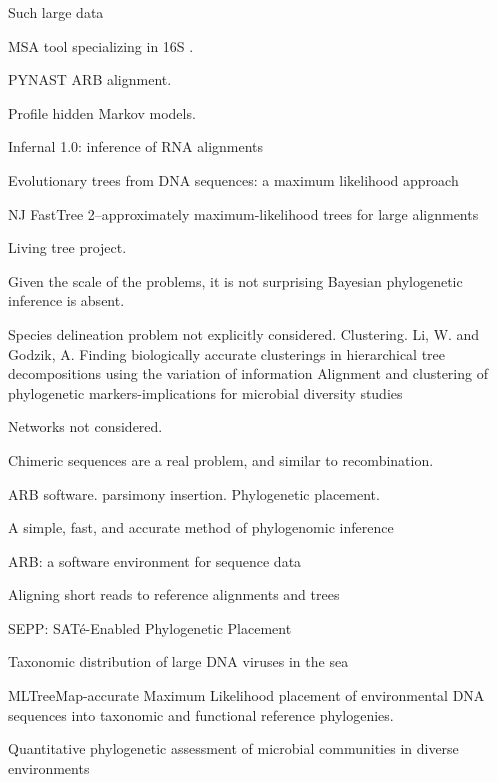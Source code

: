 \documentclass{amsart}
\begin{document}
Such large data

MSA tool specializing in 16S \cite{pruesse2012sina}.

PYNAST
ARB alignment.

\citep{eddy1998profile}
Profile hidden Markov models.

\citep{nawrocki2009infernal}
Infernal 1.0: inference of RNA alignments

\citep{felsenstein1981evolutionary}
{Evolutionary trees from DNA sequences: a maximum likelihood approach}

NJ
\citep{price2010fasttree}
{FastTree 2--approximately maximum-likelihood trees for large alignments}

Living tree project.

Given the scale of the problems, it is not surprising Bayesian phylogenetic inference is absent.


Species delineation problem not explicitly considered. Clustering.
\citep{li2006cdhit}
Li, W.  and Godzik, A.
\citep{edgar2010usearch}
\citep{navlakha2009finding} Finding biologically accurate clusterings in hierarchical tree decompositions using the variation of information
\citep{white2010alignment} Alignment and clustering of phylogenetic markers-implications for microbial diversity studies

Networks not considered.

Chimeric sequences are a real problem, and similar to recombination.

ARB software.
parsimony insertion.
Phylogenetic placement.

\citep{wu2008simple}
A simple, fast, and accurate method of phylogenomic inference

\citep{matsen2010pplacer}

\citep{ludwig2004arb}
{{ARB}: a software environment for sequence data}
\citep{berger2011performance}

\citep{berger2011aligning}
Aligning short reads to reference alignments and trees

\citep{mirarabsepp}
{SEPP: SAT{\'e}-Enabled Phylogenetic Placement}

\citep{monierEaLargeViruses08}
{Taxonomic distribution of large DNA viruses in the sea}

\citep{stark2010mltreemap}
{{MLTreeMap}-accurate Maximum Likelihood placement of environmental DNA sequences into taxonomic and functional reference phylogenies.}

\citep{vonMeringEaQuantitative08}
{Quantitative phylogenetic assessment of microbial communities in diverse environments}
\end{document}
